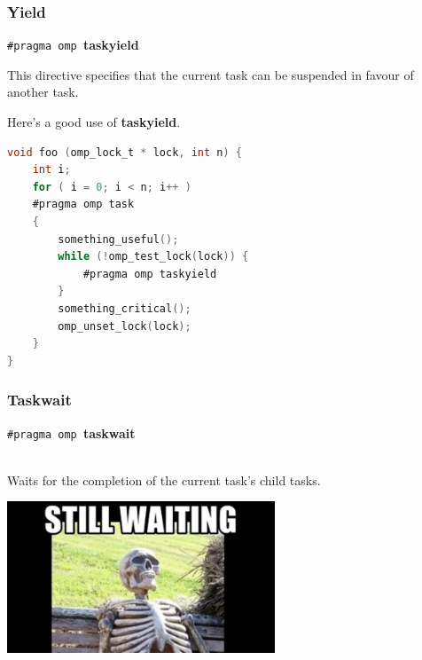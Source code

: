 \begin{frame}[fragile]
\frametitle{Yield}

  \begin{center}
    {\tt \#pragma omp }{\bf taskyield}
  \end{center}

This directive specifies that the current task can be suspended in favour of another task.

  Here's a good use of {\bf taskyield}.

  \begin{lstlisting}[language=C]
void foo (omp_lock_t * lock, int n) {
    int i;
    for ( i = 0; i < n; i++ )
    #pragma omp task
    {
        something_useful();
        while (!omp_test_lock(lock)) {
            #pragma omp taskyield
        }
        something_critical();
        omp_unset_lock(lock);
    }
}
  \end{lstlisting}



\end{frame}



\begin{frame}
\frametitle{Taskwait}

  \begin{center}
    {\tt \#pragma omp }{\bf taskwait}
  \end{center}~\\[1em]

     Waits for the completion of the current task's child tasks.

\begin{center}
\includegraphics[width=0.6\textwidth]{images/stillwaiting.jpg}
\end{center}

\end{frame}


